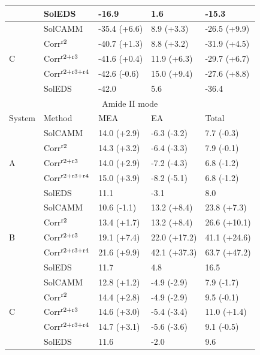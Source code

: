 \documentclass[b5paper,oneside,fleqn,11pt]{book}
\begin{document}
\begin{appendices}
\begin{table}[ht]
\begin{tabular*}{1.0\textwidth}{@{\extracolsep{\fill} } l ll ll}
                     & SolEDS    & -16.9         & 1.6        & -15.3        \\
\hline
\multirow{5}{*}{C}   & SolCAMM   & -35.4 (+6.6)  & 8.9 (+3.3) & -26.5 (+9.9) \\
        & Corr$^{\rm r2}$        & -40.7 (+1.3)  & 8.8 (+3.2) & -31.9 (+4.5) \\
        & Corr$^{\rm r2+r3}$     & -41.6 (+0.4)  &11.9 (+6.3) & -29.7 (+6.7) \\
        & Corr$^{\rm r2+r3+r4}$  & -42.6 (-0.6)  &15.0 (+9.4) & -27.6 (+8.8) \\
                     & SolEDS    & -42.0         & 5.6        & -36.4        \\
\hline\hline
\multicolumn{5}{c}{Amide II mode} \\
\hline
System               & Method    & MEA           & EA         & Total        \\
\hline
\multirow{5}{*}{A}   & SolCAMM   & 14.0 (+2.9)   & -6.3 (-3.2)& 7.7 (-0.3)   \\
        & Corr$^{\rm r2}$        & 14.3 (+3.2)   & -6.4 (-3.3)& 7.9 (-0.1)   \\
        & Corr$^{\rm r2+r3}$     & 14.0 (+2.9)   & -7.2 (-4.3)& 6.8 (-1.2)   \\
        & Corr$^{\rm r2+r3+r4}$  & 15.0 (+3.9)   & -8.2 (-5.1)& 6.8 (-1.2)   \\
                     & SolEDS    & 11.1          & -3.1       & 8.0          \\
\hline
\multirow{5}{*}{B}   & SolCAMM   & 10.6 (-1.1)   & 13.2 (+8.4)& 23.8 (+7.3)  \\
        & Corr$^{\rm r2}$        & 13.4 (+1.7)   & 13.2 (+8.4)& 26.6 (+10.1) \\
        & Corr$^{\rm r2+r3}$     & 19.1 (+7.4)   & 22.0 (+17.2)&41.1 (+24.6) \\
        & Corr$^{\rm r2+r3+r4}$  & 21.6 (+9.9)   & 42.1 (+37.3)&63.7 (+47.2) \\
                     & SolEDS    & 11.7          & 4.8        & 16.5         \\
\hline
\multirow{5}{*}{C}   & SolCAMM   & 12.8 (+1.2)   & -4.9 (-2.9)& 7.9 (-1.7)   \\
        & Corr$^{\rm r2}$        & 14.4 (+2.8)   & -4.9 (-2.9)& 9.5 (-0.1)   \\
        & Corr$^{\rm r2+r3}$     & 14.6 (+3.0)   & -5.4 (-3.4)&11.0 (+1.4)   \\
        & Corr$^{\rm r2+r3+r4}$  & 14.7 (+3.1)   & -5.6 (-3.6)& 9.1 (-0.5)   \\
                     & SolEDS    & 11.6          & -2.0       & 9.6          \\
\hline\hline
\end{tabular*}
\end{table}



\end{appendices}
\end{document}
